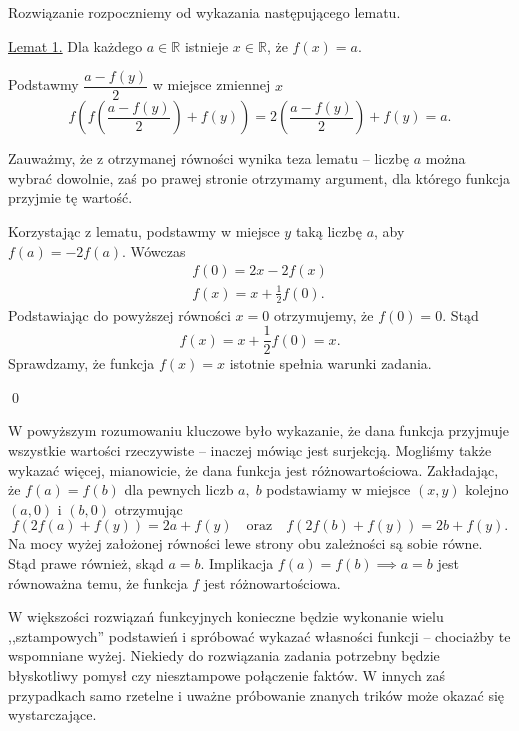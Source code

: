 \newpage


\noindent
Rozwiązanie rozpoczniemy od wykazania następującego lematu.

\vspace{10px}

\noindent
\underline{Lemat 1.} Dla każdego $a \in \mathbb{R}$ istnieje $x \in \mathbb{R}$, że $f(x) = a$.

\vspace{5px}

\noindent
Podstawmy $\dfrac{a - f(y)}{2}$ w miejsce zmiennej $x$
\[
    f\left(f\left(\frac{a - f(y)}{2}\right) + f(y)\right) = 2(\frac{a - f(y)}{2}) + f(y) = a.
\]

\noindent
Zauważmy, że z otrzymanej równości wynika teza lematu – liczbę $a$ można wybrać dowolnie, zaś po prawej stronie otrzymamy argument, dla którego funkcja przyjmie tę wartość.

\vspace{10px}

\noindent
Korzystając z lematu, podstawmy w miejsce $y$ taką liczbę $a$, aby $f(a) = -2f(a)$. Wówczas
\begin{gather*}
    f(0) = 2x - 2f(x) \\
    f(x) = x  + \frac{1}{2}f(0).
\end{gather*}
Podstawiając do powyższej równości $x = 0$ otrzymujemy, że $f(0) = 0$. Stąd
\[
    f(x) = x + \frac{1}{2}f(0) = x.
\]
Sprawdzamy, że funkcja $f(x) = x$ istotnie spełnia warunki zadania.

\qed

\vspace{10px}

\noindent
W powyższym rozumowaniu kluczowe było wykazanie, że dana funkcja przyjmuje wszystkie wartości rzeczywiste -- inaczej mówiąc jest surjekcją. Mogliśmy także wykazać więcej, mianowicie, że dana funkcja jest różnowartościowa. Zakładając, że $f(a) = f(b)$ dla pewnych liczb $a,\;b$ podstawiamy w miejsce $(x, y)$ kolejno $(a, 0)$ i $(b, 0)$ otrzymując
\[
    f(2f(a) + f(y)) = 2a + f(y) \quad \text{oraz} \quad f(2f(b) + f(y)) = 2b + f(y).
\]
Na mocy wyżej założonej równości lewe strony obu zależności są sobie równe. Stąd prawe również, skąd $a = b$. Implikacja $f(a) = f(b) \implies a = b$ jest równoważna temu, że funkcja $f$ jest różnowartościowa.

\vspace{10px}

\noindent
W większości rozwiązań funkcyjnych konieczne będzie wykonanie wielu ,,sztampowych'' podstawień i spróbować wykazać własności funkcji -- chociażby te wspomniane wyżej. Niekiedy do rozwiązania zadania potrzebny będzie błyskotliwy pomysł czy niesztampowe połączenie faktów. W innych zaś przypadkach samo rzetelne i uważne próbowanie znanych trików może okazać się wystarczające. 

\vspace{10px}
